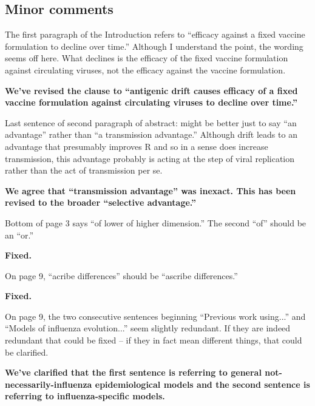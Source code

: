 \documentclass[11pt,oneside,letterpaper]{article}
\begin{document}
\subsection*{Minor comments}

The first paragraph of the Introduction refers to ``efficacy against a fixed vaccine formulation to decline over time.'' Although I understand the point, the wording seems off here. What declines is the efficacy of the fixed vaccine formulation against circulating viruses, not the efficacy against the vaccine formulation. 

\textbf{We've revised the clause to ``antigenic drift causes efficacy of a fixed vaccine formulation against circulating viruses to decline over time.''}

Last sentence of second paragraph of abstract: might be better just to say ``an advantage'' rather than ``a transmission advantage.'' Although drift leads to an advantage that presumably improves R and so in a sense does increase transmission, this advantage probably is acting at the step of viral replication rather than the act of transmission per se. 

\textbf{We agree that ``transmission advantage'' was inexact.  This has been revised to the broader ``selective advantage.''}

Bottom of page 3 says ``of lower of higher dimension.'' The second ``of'' should be an ``or.'' 

\textbf{Fixed.}

On page 9, ``acribe differences'' should be ``ascribe differences.''

\textbf{Fixed.}

On page 9, the two consecutive sentences beginning ``Previous work using...'' and ``Models of influenza evolution...'' seem slightly redundant. If they are indeed redundant that could be fixed -- if they in fact mean different things, that could be clarified. 

\textbf{We've clarified that the first sentence is referring to general not-necessarily-influenza epidemiological models and the second sentence is referring to influenza-specific models.}
\end{document}
